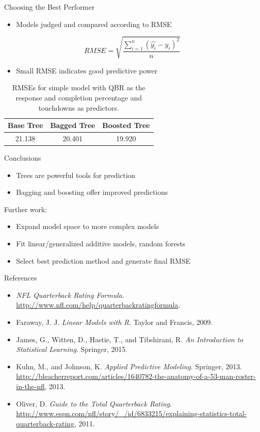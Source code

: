 \documentclass{beamer}
\begin{document}
	\begin{frame}{Choosing the Best Performer}
		\begin{itemize}
			\item Models judged and compared according to RMSE
		\end{itemize}
		\begin{equation}
			RMSE=\sqrt{\frac{\sum_{i=1}^{n}(\hat{y_{i}}-y_{i})^{2}}{n}}
		\end{equation}		
		\begin{itemize}
			\item Small RMSE indicates good predictive power
		\end{itemize}
		\begin{table}
			\centering
			\begin{tabular}{|c|c|c|}
				\hline
				Base Tree & Bagged Tree & Boosted Tree\\
				\hline
				21.138 & 20.401 & 19.920\\
				\hline
			\end{tabular}
		\caption{RMSEs for simple model with QBR as the response and completion percentage and touchdowns as predictors.}
		\end{table}
	\end{frame}

	\begin{frame}{Conclusions}
		\begin{itemize}
			\item Trees are powerful tools for prediction
			\item Bagging and boosting offer improved predictions
		\end{itemize}
		Further work:
		\begin{itemize}
			\item Expand model space to more complex models
			\item Fit linear/generalized additive models, random forests
			\item Select best prediction method and generate final RMSE
		\end{itemize}
	\end{frame}

	\begin{frame}{References}
		\begin{itemize}
			\item \textit{NFL Quarterback Rating Formula}. \url{http://www.nfl.com/help/quarterbackratingformula}.
			\item Faraway, J. J. \textit{Linear Models with R}. Taylor and Francis, 2009.
			\item James, G., Witten, D., Hastie, T., and Tibshirani, R. \textit{An Introduction to Statistical Learning}. Springer, 2015.
			\item Kuhn, M., and Johnson, K. \textit{Applied Predictive Modeling}. Springer, 2013. \url{http://bleacherreport.com/articles/1640782-the-anatomy-of-a-53-man-roster-in-the-nfl}, 2013.
			\item Oliver, D. \textit{Guide to the Total Quarterback Rating}.\\
			\url{http://www.espn.com/nfl/story/_/id/6833215/explaining-statistics-total-quarterback-rating}, 2011.
		\end{itemize}
	\end{frame}
	
\end{document}
